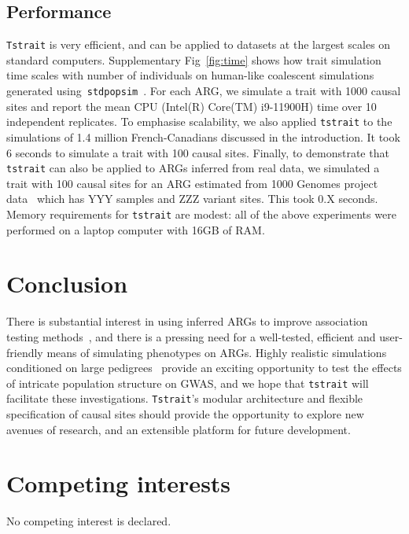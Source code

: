 \documentclass[unnumsec,webpdf,modern,large,namedate]{oup-authoring-template}%
\begin{document}
\subsection{Performance}
\texttt{Tstrait} is very efficient, and can be applied to datasets at the
largest scales on standard computers.
Supplementary Fig~\ref{fig:time} shows how trait simulation time scales
with number of individuals on human-like coalescent simulations
generated using~\texttt{stdpopsim}~\citep{adrion2020}.
For each ARG, we simulate a trait with 1000 causal sites
and report the mean CPU (Intel(R) Core(TM) i9-11900H)
time over 10 independent replicates.
To emphasise scalability, we also
applied \texttt{tstrait} to the simulations of 1.4 million
French-Canadians discussed in the introduction.
It took 6 seconds to simulate a trait with 100 causal sites.
Finally, to demonstrate that \texttt{tstrait} can also be applied
to ARGs inferred from real data, we simulated a trait with 100 causal
sites for an ARG estimated from 1000 Genomes project
data~\citep{kelleher2019} which has YYY samples
and ZZZ variant sites. This took 0.X seconds.
Memory requirements for \texttt{tstrait} are modest: all of the
above experiments were performed on a laptop computer with 16GB of RAM.

\section{Conclusion}
There is substantial interest in using inferred ARGs to improve
association testing
methods~\citep{zhang2023,link2023tree,nowbandegani2023extremely},
and there is a pressing need for a well-tested, efficient
and user-friendly means of simulating phenotypes on ARGs.
Highly realistic simulations conditioned on large
pedigrees~\citep{anderson2023} provide an exciting opportunity
to test the effects of intricate population structure on
GWAS, and we hope that \texttt{tstrait} will facilitate these
investigations. \texttt{Tstrait}'s modular architecture
and flexible specification of causal sites
should provide the opportunity to explore new avenues of research,
and an extensible platform for future development.

\section{Competing interests}
No competing interest is declared.
\end{document}
